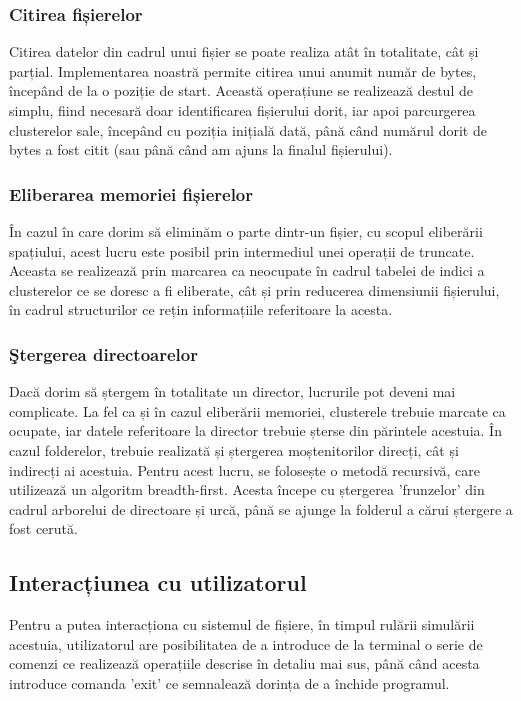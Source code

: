 \subsubsection{Citirea fișierelor}

Citirea datelor din cadrul unui fișier se poate realiza atât în totalitate, cât și parțial. Implementarea noastră permite citirea unui anumit număr de bytes, începând de la o poziție de start. Această operațiune se realizează destul de simplu, fiind necesară doar identificarea fișierului dorit, iar apoi parcurgerea clusterelor sale, începând cu poziția inițială dată, până când numărul dorit de bytes a fost citit (sau până când am ajuns la finalul fișierului).


\subsubsection{Eliberarea memoriei fișierelor}

În cazul în care dorim să eliminăm o parte dintr-un fișier, cu scopul eliberării spațiului, acest lucru este posibil prin intermediul unei operații de truncate. Aceasta se realizează prin marcarea ca neocupate în cadrul tabelei de indici a clusterelor ce se doresc a fi eliberate, cât și prin reducerea dimensiunii fișierului, în cadrul structurilor ce rețin informațiile referitoare la acesta.

\subsubsection{Ştergerea directoarelor}

Dacă dorim să ștergem în totalitate un director, lucrurile pot deveni mai complicate. La fel ca și în cazul eliberării memoriei, clusterele trebuie marcate ca ocupate, iar datele referitoare la director trebuie șterse din părintele acestuia. În cazul folderelor, trebuie realizată și ștergerea moștenitorilor direcți, cât și indirecți ai acestuia. Pentru acest lucru, se folosește o metodă recursivă, care utilizează un algoritm breadth-first. Acesta începe cu ștergerea 'frunzelor' din cadrul arborelui de directoare și urcă, până se ajunge la folderul a cărui ștergere a fost cerută.


\subsection{Interacțiunea cu utilizatorul}

Pentru a putea interacționa cu sistemul de fișiere, în timpul rulării simulării acestuia, utilizatorul are posibilitatea de a introduce de la terminal o serie de comenzi ce realizează operațiile descrise în detaliu mai sus, până când acesta introduce comanda 'exit' ce semnalează dorința de a închide programul.

